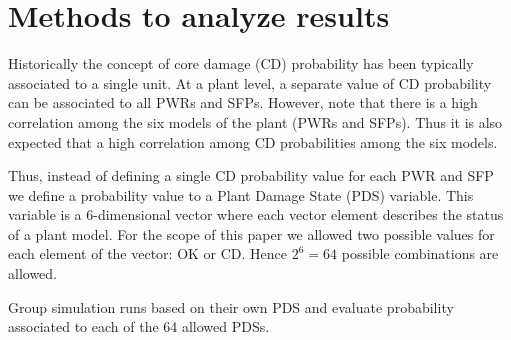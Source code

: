 \section{Methods to analyze results}
\label{sec:plantAnalysisResults}

Historically the concept of core damage (CD) probability has been typically 
associated to a single unit. At a plant level, a separate value of CD 
probability can be associated to all PWRs and SFPs. However, note that there 
is a high correlation among the six models of the plant (PWRs and SFPs). 
Thus it is also expected that a high correlation among CD probabilities among 
the six models.

Thus, instead of defining a single CD probability value for each PWR and SFP 
we define a probability value to a Plant Damage State (PDS) variable. This 
variable is a $6$-dimensional vector where each vector element describes the 
status of a plant model. For the scope of this paper we allowed two possible 
values for each element of the vector: OK or CD. Hence $2^6=64$ possible 
combinations are allowed.

Group simulation runs based on their own PDS and evaluate probability associated 
to each of the 64 allowed PDSs.
